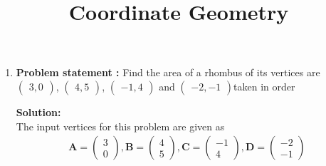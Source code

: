 \documentclass[12pt]{article}
\newcommand{\solution}{\noindent \textbf{Solution: }}
\newcommand{\myvec}[1]{\ensuremath{\begin{pmatrix}#1\end{pmatrix}}}
\let\vec\mathbf
\begin{document}
\begin{center}
\title{\textbf{Coordinate Geometry}}
\date{\vspace{-5ex}} %
\maketitle
\end{center}

\setcounter{page}{1}



\begin{enumerate}

\item\textbf{Problem statement :} Find the area of a rhombus of its vertices are $\myvec{3 ,0}$, $\myvec{4 ,5}$, $\myvec{-1 ,4}$ and $\myvec{-2 ,-1}$taken in order

\solution \\
The input vertices for this problem are given as
	\begin{align}
	\vec{A} = \myvec{
		3\\
		0
		},
	\vec{B} = \myvec{
		4\\
		5
		},
        \vec{C} = \myvec{
		-1\\
		4
		},
        \vec{D} = \myvec{
		-2\\
		-1
		}
	\end{align}
		


\end{enumerate}
\end{document}
